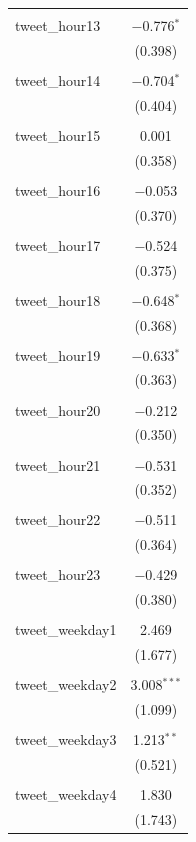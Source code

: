 \documentclass{article}
\begin{document}
\begin{longtable}{@{\extracolsep{10pt}}lc}
  & \\ 
 tweet\_hour13 & $-$0.776$^{*}$ \\ 
  & (0.398) \\ 
  & \\ 
 tweet\_hour14 & $-$0.704$^{*}$ \\ 
  & (0.404) \\ 
  & \\ 
 tweet\_hour15 & 0.001 \\ 
  & (0.358) \\ 
  & \\ 
 tweet\_hour16 & $-$0.053 \\ 
  & (0.370) \\ 
  & \\ 
 tweet\_hour17 & $-$0.524 \\ 
  & (0.375) \\ 
  & \\ 
 tweet\_hour18 & $-$0.648$^{*}$ \\ 
  & (0.368) \\ 
  & \\ 
 tweet\_hour19 & $-$0.633$^{*}$ \\ 
  & (0.363) \\ 
  & \\ 
 tweet\_hour20 & $-$0.212 \\ 
  & (0.350) \\ 
  & \\ 
 tweet\_hour21 & $-$0.531 \\ 
  & (0.352) \\ 
  & \\ 
 tweet\_hour22 & $-$0.511 \\ 
  & (0.364) \\ 
  & \\ 
 tweet\_hour23 & $-$0.429 \\ 
  & (0.380) \\ 
  & \\ 
 tweet\_weekday1 & 2.469 \\ 
  & (1.677) \\ 
  & \\ 
 tweet\_weekday2 & 3.008$^{***}$ \\ 
  & (1.099) \\ 
  & \\ 
 tweet\_weekday3 & 1.213$^{**}$ \\ 
  & (0.521) \\ 
  & \\ 
 tweet\_weekday4 & 1.830 \\ 
  & (1.743) \\ 

\end{longtable}
\end{document}
